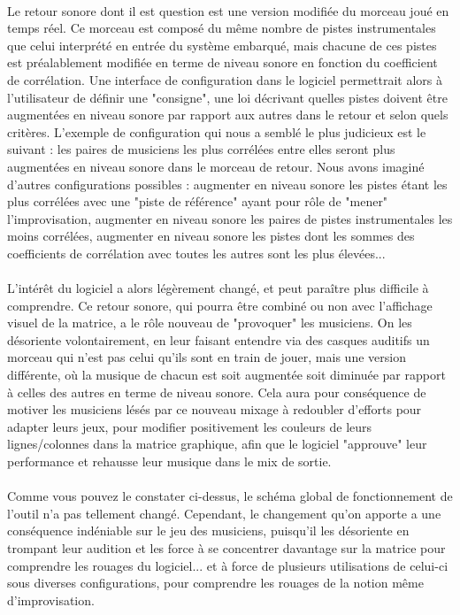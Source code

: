 \paragraph{}
Le retour sonore dont il est question est une version modifiée du
morceau joué en temps réel. Ce morceau est composé du même nombre de
pistes instrumentales que celui interprété en entrée du système
embarqué, mais chacune de ces pistes est préalablement modifiée en
terme de niveau sonore en fonction du coefficient de corrélation. Une
interface de configuration dans le logiciel permettrait alors à
l'utilisateur de définir une "consigne", une loi décrivant quelles
pistes doivent être augmentées en niveau sonore par rapport aux autres
dans le retour et selon quels critères. L'exemple de configuration qui
nous a semblé le plus judicieux est le suivant : les paires de
musiciens les plus corrélées entre elles seront plus augmentées en
niveau sonore dans le morceau de retour. Nous avons imaginé d'autres
configurations possibles : augmenter en niveau sonore les pistes étant
les plus corrélées avec une "piste de référence" ayant pour rôle de
"mener" l'improvisation, augmenter en niveau sonore les paires de
pistes instrumentales les moins corrélées, augmenter en niveau sonore
les pistes dont les sommes des coefficients de corrélation avec toutes
les autres sont les plus élevées...
\paragraph{}
L'intérêt du logiciel a alors légèrement changé, et peut paraître plus
difficile à comprendre. Ce retour sonore, qui pourra être combiné ou
non avec l'affichage visuel de la matrice, a le rôle nouveau de
"provoquer" les musiciens. On les désoriente volontairement, en leur
faisant entendre via des casques auditifs un morceau qui n'est pas
celui qu'ils sont en train de jouer, mais une version différente, où
la musique de chacun est soit augmentée soit diminuée par rapport à
celles des autres en terme de niveau sonore. Cela aura pour
conséquence de motiver les musiciens lésés par ce nouveau mixage à
redoubler d'efforts pour adapter leurs jeux, pour modifier
positivement les couleurs de leurs lignes/colonnes dans la matrice
graphique, afin que le logiciel "approuve" leur performance et
rehausse leur musique dans le mix de sortie.

\paragraph{}
Comme vous pouvez le constater ci-dessus, le schéma global de
fonctionnement de l'outil n'a pas tellement changé. Cependant, le
changement qu'on apporte a une conséquence indéniable sur le jeu des
musiciens, puisqu'il les désoriente en trompant leur audition et les
force à se concentrer davantage sur la matrice pour comprendre les
rouages du logiciel... et à force de plusieurs utilisations de
celui-ci sous diverses configurations, pour comprendre les rouages de
la notion même d'improvisation.
